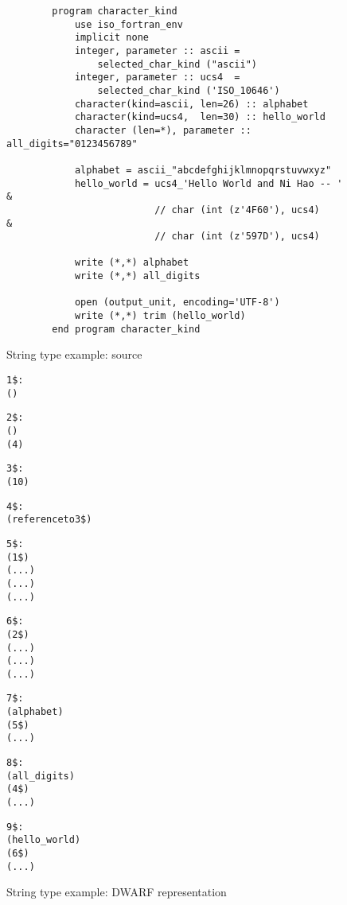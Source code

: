 \begin{figure}[ht]
\begin{lstlisting}
        program character_kind
            use iso_fortran_env
            implicit none
            integer, parameter :: ascii = 
                selected_char_kind ("ascii")
            integer, parameter :: ucs4  = 
                selected_char_kind ('ISO_10646')
            character(kind=ascii, len=26) :: alphabet
            character(kind=ucs4,  len=30) :: hello_world
            character (len=*), parameter :: all_digits="0123456789"
              
            alphabet = ascii_"abcdefghijklmnopqrstuvwxyz"
            hello_world = ucs4_'Hello World and Ni Hao -- ' &
                          // char (int (z'4F60'), ucs4)     &
                          // char (int (z'597D'), ucs4)
              
            write (*,*) alphabet
            write (*,*) all_digits
              
            open (output_unit, encoding='UTF-8')
            write (*,*) trim (hello_world)
        end program character_kind
\end{lstlisting}
\caption{String type example: source}
\label{fig:stringtypeexamplesource}
\end{figure}

\begin{figure}[ht]
\begin{dwflisting}
\begin{alltt}

1\$: \DWTAGbasetype
        \DWATencoding (\DWATEASCII)

2\$: \DWTAGbasetype
        \DWATencoding (\DWATEUCS)
        \DWATbytesize (4)

3\$: \DWTAGstringtype
        \DWATbytesize (10)

4\$: \DWTAGconsttype
        \DWATtype (reference to 3\$)
      
5\$: \DWTAGstringtype
        \DWATtype (1\$)
        \DWATstringlength ( ... )
        \DWATstringlengthbytesize ( ... )
        \DWATdatalocation ( ... )
      
6\$: \DWTAGstringtype
        \DWATtype (2\$)
        \DWATstringlength ( ... )
        \DWATstringlengthbytesize ( ... )
        \DWATdatalocation ( ... )

7\$: \DWTAGvariable
        \DWATname (alphabet)
        \DWATtype (5\$)
        \DWATlocation ( ... )

8\$: \DWTAGconstant
        \DWATname (all\_digits)
        \DWATtype (4\$)
        \DWATconstvalue ( ... )

9\$: \DWTAGvariable
        \DWATname (hello\_world)
        \DWATtype (6\$)
        \DWATlocation ( ... )
        
\end{alltt}
\end{dwflisting}
\caption{String type example: DWARF representation}
\label{fig:stringtypeexampledwarf}
\end{figure}

